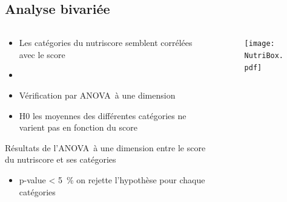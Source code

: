 \subsection{Analyse bivariée}
\begin{frame}{\insertsubsection}
  \begin{columns}
    \begin{column}{.55\textwidth}
      \begin{itemize}
        \item Les catégories du nutriscore semblent corrélées avec le score
        \item[]
        \item Vérification par ANOVA à une dimension
        \item H0 les moyennes des différentes catégories ne varient pas en fonction du score
      \end{itemize}
      \begin{table}
        \tiny
        
        \caption{Résultats de l'ANOVA à une dimension entre le score du nutriscore et ses catégories}
      \end{table}
      \begin{itemize}
        \item p-value \qty{< 5}{\percent} on rejette l'hypothèse pour chaque catégories
      \end{itemize}
    \end{column}
    \begin{column}{.45\textwidth}
      \begin{figure}
        \texttt{[image: NutriBox.pdf]}
      \end{figure}
    \end{column}
  \end{columns}
\end{frame}

